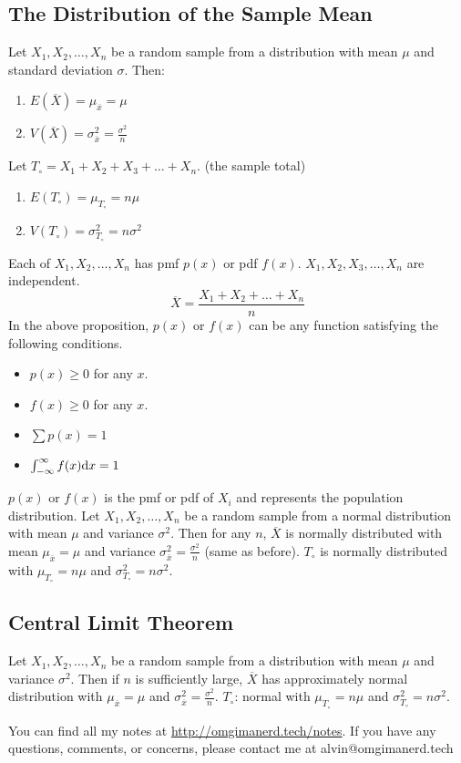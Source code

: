 \documentclass{math}
\begin{document}
\subsection*{The Distribution of the Sample Mean}
Let \( X_{1},X_{2},\dots,X_{n} \) be a random sample from a distribution with
mean \( \mu \) and standard deviation \( \sigma \). Then:
\begin{enumerate}
  \item \( E(\overline{X}) = \mu_{\overline{x}} = \mu \)
  \item \( V(\overline{X}) = \sigma_{\overline{x}}^{2} = \frac{\sigma^{2}}{n} \)
\end{enumerate}
Let \( T_{\circ} = X_{1}+X_{2}+X_{3}+\dots+X_{n} \). (the sample total)
\begin{enumerate}
  \item \( E(T_{\circ}) = \mu_{T_{\circ}} = n\mu \)
  \item \( V(T_{\circ}) = \sigma_{T_{\circ}}^{2} = n\sigma^{2} \)
\end{enumerate}
Each of \( X_{1},X_{2},\dots,X_{n} \) has pmf \( p(x) \) or pdf \( f(x) \).
\( X_{1},X_{2},X_{3},\dots,X_{n} \) are independent.
\[ \overline{X} = \frac{X_{1}+X_{2}+\dots+X_{n}}{n} \]
In the above proposition, \( p(x) \) or \( f(x) \) can be any function
satisfying the following conditions.
\begin{itemize}
  \item \( p(x)\geq 0 \) for any \( x \).
  \item \( f(x)\geq 0 \) for any \( x \).
  \item \( \sum p(x) = 1 \)
  \item \( \int_{-\infty}^{\infty}f(x)\mathrm{d}{x} = 1 \)
\end{itemize}
\( p(x) \) or \( f(x) \) is the pmf or pdf of \( X_{i} \) and represents the
population distribution. Let \( X_{1},X_{2},\dots,X_{n} \) be a random
sample from a normal distribution with mean \( \mu \) and variance
\( \sigma^{2} \). Then for any \( n \), \( \overline{X} \) is normally
distributed with mean \( \mu_{\overline{x}} = \mu \) and variance
\( \sigma_{\overline{x}}^{2} = \frac{\sigma^{2}}{n} \) (same as before).
\( T_{\circ} \) is normally distributed with \( \mu_{T_{\circ}} = n\mu \)
and \( \sigma_{T_{\circ}}^{2} = n\sigma^{2} \).

\subsection*{Central Limit Theorem}
Let \( X_{1},X_{2},\dots,X_{n} \) be a random sample from a distribution
with mean \( \mu \) and variance \( \sigma^{2} \). Then if \( n \) is
sufficiently large, \( \overline{X} \) has approximately normal distribution
with \( \mu_{\overline{x}} = \mu \) and \( \sigma_{\overline{x}}^{2} =
\frac{\sigma^{2}}{n} \). \( T_{\circ} \): normal with \( \mu_{T_{\circ}} =
n\mu \) and \( \sigma_{T_{\circ}}^{2} = n\sigma^{2} \).

\begin{center}
  You can find all my notes at \url{http://omgimanerd.tech/notes}. If you have
  any questions, comments, or concerns, please contact me at
  alvin@omgimanerd.tech
\end{center}
\end{document}
